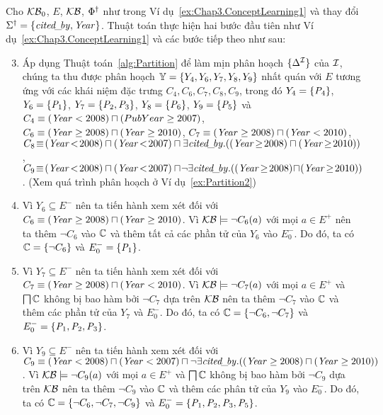 \begin{Example}
\label{ex:Chap3.ConceptLearning3}
	Cho $\mathcal{KB}_0$, $E$, $\mathcal{KB}$, $\Phi^\dag$ như trong Ví dụ~\ref{ex:Chap3.ConceptLearning1} và thay đổi $\Sigma^\dag = \{\mathit{cited\!\_\!by}, \mathit{Year}\}$. Thuật toán \BBCLearnS thực hiện hai bước đầu tiên như Ví dụ~\ref{ex:Chap3.ConceptLearning1} và các bước tiếp theo như sau:	
	\begin{enumerate}
		\setcounter{enumi}{2}
		\item Áp dụng Thuật toán~\ref{alg:Partition} để làm mịn phân hoạch $\{\Delta^{\mathcal{I}}\}$ của $\mathcal{I}$, chúng ta thu được phân hoạch $\mathbb{Y} = \{Y_4, Y_6, Y_7, Y_8, Y_9\}$ nhất quán với $E$ tương ứng với các khái niệm đặc trưng $C_4, C_6, C_7, C_8, C_9$, trong đó
		$Y_4 = \{\mathit{P}_4\}$,
		$Y_6 = \{\mathit{P}_1\}$,
		$Y_7 = \{\mathit{P}_2, \mathit{P}_3\}$,
		$Y_8 = \{\mathit{P}_6\}$,
		$Y_9 = \{\mathit{P}_5\}$ và
		$C_4 \equiv (\mathit{Year} < 2008) \sqcap (PubYear \geq 2007)$, 
		$C_6 \equiv (\mathit{Year} \geq 2008) \sqcap (\mathit{Year} \geq 2010)$, 
		$C_7 \equiv (\mathit{Year} \geq 2008) \sqcap (\mathit{Year} < 2010)$,
		$C_8\!\equiv\!(\PubYear\!<\!2008) \mand (\PubYear\!<\!2007) \mand \E \Citedby.((\PubYear\!\geq\!2008) \mand (\PubYear\!\geq\!2010))$,
		$C_9\!\equiv\!(\PubYear\!<\!2008) \mand (\PubYear\!<\!2007) \mand\!\neg\E\Citedby.((\PubYear\!\geq\!2008)\!\mand\!(\PubYear\!\geq\!2010))$. (Xem quá trình phân hoạch ở Ví dụ~\ref{ex:Partition2})
		
		\item Vì $Y_6 \subseteq E^-$ nên ta tiến hành xem xét đối với $C_6 \equiv (\mathit{Year} \geq 2008) \sqcap (\mathit{Year} \geq 2010)$. Vì $\mathcal{KB} \models \neg C_6(a)$ với mọi $a \in E^+$ nên ta thêm $\neg C_6$ vào $\mathbb{C}$ và thêm tất cả các phần tử của $Y_6$ vào $E^-_0$. Do đó, ta có $\mathbb{C} = \{\neg C_6\}$ và $E_0^- = \{\mathit{P}_1\}$.
		
		\item Vì $Y_7 \subseteq E^-$ nên ta tiến hành xem xét đối với $C_7 \equiv (\mathit{Year} \geq 2008) \sqcap (\mathit{Year} < 2010)$. Vì $\mathcal{KB} \models \neg C_7(a)$ với mọi $a \in E^+$ và $\bigsqcap\mathbb{C}$ không bị bao hàm bởi $\neg C_7$ dựa trên $\mathcal{KB}$ nên ta thêm $\neg C_7$ vào $\mathbb{C}$ và thêm các phần tử của $Y_7$ và $E^-_0$. Do đó, ta có $\mathbb{C} = \{\neg C_6, \neg C_7\}$ và $E_0^- = \{\mathit{P}_1, \mathit{P}_2, \mathit{P}_3\}$.
		
		\item Vì $Y_9 \subseteq E^-$ nên ta tiến hành xem xét đối với $C_9 \equiv (\mathit{Year} < 2008) \sqcap (\mathit{Year} < 2007) \sqcap \neg\exists\mathit{cited\!\_\!by}.((\mathit{Year} \geq 2008) \sqcap (\mathit{Year} \geq 2010))$. Vì $\mathcal{KB} \models \neg C_9(a)$ với mọi $a \in E^+$ và $\bigsqcap\mathbb{C}$ không bị bao hàm bởi $\neg C_9$ dựa trên $\mathcal{KB}$ nên ta thêm $\neg C_9$ vào $\mathbb{C}$ và thêm các phân tử của $Y_9$ vào $E^-_0$. Do đó, ta có $\mathbb{C} = \{\neg C_6, \neg C_7, \neg C_9\}$ và $E^-_0 = \{\mathit{P}_1, \mathit{P}_2, \mathit{P}_3, \mathit{P}_5\}$. 
		

\end{enumerate}
\end{Example}
